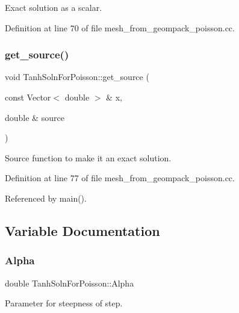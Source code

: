 Exact solution as a scalar. 



Definition at line 70 of file mesh\+\_\+from\+\_\+geompack\+\_\+poisson.\+cc.

\mbox{\label{namespaceTanhSolnForPoisson_ae1b9d6789ff301e3d63a4e292213036c}} 
\subsubsection{\texorpdfstring{get\+\_\+source()}{get\_source()}}
{\footnotesize\ttfamily void Tanh\+Soln\+For\+Poisson\+::get\+\_\+source (\begin{DoxyParamCaption}\item[{const Vector$<$ double $>$ \&}]{x,  }\item[{double \&}]{source }\end{DoxyParamCaption})}



Source function to make it an exact solution. 



Definition at line 77 of file mesh\+\_\+from\+\_\+geompack\+\_\+poisson.\+cc.



Referenced by main().



\subsection{Variable Documentation}
\mbox{\label{namespaceTanhSolnForPoisson_ae676ccd186d5df119cce811596d949c1}} 
\subsubsection{\texorpdfstring{Alpha}{Alpha}}
{\footnotesize\ttfamily double Tanh\+Soln\+For\+Poisson\+::\+Alpha}



Parameter for steepness of step. 



